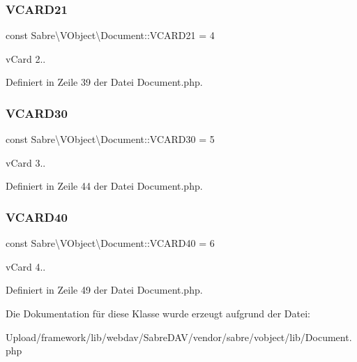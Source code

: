 \subsubsection{\texorpdfstring{V\+C\+A\+R\+D21}{VCARD21}}
{\footnotesize\ttfamily const Sabre\textbackslash{}\+V\+Object\textbackslash{}\+Document\+::\+V\+C\+A\+R\+D21 = 4}

v\+Card 2.. 

Definiert in Zeile 39 der Datei Document.\+php.

\mbox{\label{class_sabre_1_1_v_object_1_1_document_a5103d6dcd6e9040808f2b30c1ccad9c1}} 
\subsubsection{\texorpdfstring{V\+C\+A\+R\+D30}{VCARD30}}
{\footnotesize\ttfamily const Sabre\textbackslash{}\+V\+Object\textbackslash{}\+Document\+::\+V\+C\+A\+R\+D30 = 5}

v\+Card 3.. 

Definiert in Zeile 44 der Datei Document.\+php.

\mbox{\label{class_sabre_1_1_v_object_1_1_document_afa0952010d5ee8ba17096eba3ade6751}} 
\subsubsection{\texorpdfstring{V\+C\+A\+R\+D40}{VCARD40}}
{\footnotesize\ttfamily const Sabre\textbackslash{}\+V\+Object\textbackslash{}\+Document\+::\+V\+C\+A\+R\+D40 = 6}

v\+Card 4.. 

Definiert in Zeile 49 der Datei Document.\+php.



Die Dokumentation für diese Klasse wurde erzeugt aufgrund der Datei\+:\begin{DoxyCompactItemize}
\item 
Upload/framework/lib/webdav/\+Sabre\+D\+A\+V/vendor/sabre/vobject/lib/Document.\+php\end{DoxyCompactItemize}
